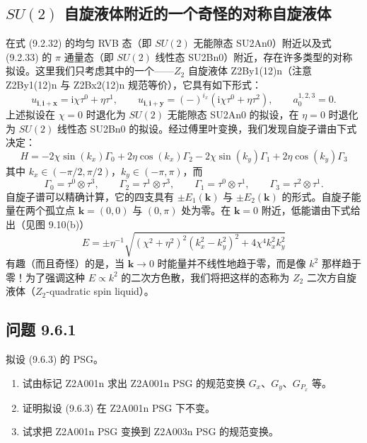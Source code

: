 \subsection{$SU(2)$ 自旋液体附近的一个奇怪的对称自旋液体}

在式 (9.2.32) 的均匀 RVB 态（即 $SU(2)$ 无能隙态 SU2An0）附近以及式 (9.2.33) 的 $\pi$ 通量态（即 $SU(2)$ 线性态 SU2Bn0）附近，存在许多类型的对称拟设。这里我们只考虑其中的一个——$Z_2$ 自旋液体 Z2By1(12)n（注意 Z2By1(12)n 与 Z2Bx2(12)n 规范等价），它具有如下形式：
\begin{equation*}
u_{\pmb{i},\pmb{i}+\pmb{x}}=\mathrm{i}\chi\tau^{0}+\eta\tau^{1},\qquad
u_{\pmb{i},\pmb{i}+\pmb{y}}=(-)^{i_x}(\mathrm{i}\chi\tau^{0}+\eta\tau^{2}),\qquad
a_0^{1,2,3}=0.
\tag{9.6.10}
\end{equation*}
上述拟设在 $\chi=0$ 时退化为 $SU(2)$ 无能隙态 SU2An0 的拟设，在 $\eta=0$ 时退化为 $SU(2)$ 线性态 SU2Bn0 的拟设。经过傅里叶变换，我们发现自旋子谱由下式决定：
\begin{equation*}
H=-2\chi\sin(k_x)\Gamma_0+2\eta\cos(k_x)\Gamma_2-2\chi\sin(k_y)\Gamma_1+2\eta\cos(k_y)\Gamma_3
\end{equation*}
其中 $k_x\in(-\pi/2,\pi/2)$，$k_y\in(-\pi,\pi)$，而
\begin{equation*}
\Gamma_0=\tau^{0}\otimes\tau^{3},\qquad
\Gamma_2=\tau^{1}\otimes\tau^{3},\qquad
\Gamma_1=\tau^{0}\otimes\tau^{1},\qquad
\Gamma_3=\tau^{2}\otimes\tau^{1}.
\end{equation*}
自旋子谱可以精确计算，它的四支具有 $\pm E_1(\pmb{k})$ 与 $\pm E_2(\pmb{k})$ 的形式。自旋子能量在两个孤立点 $\pmb{k}=(0,0)$ 与 $(0,\pi)$ 处为零。在 $\pmb{k}=0$ 附近，低能谱由下式给出（见图 9.10(b)）
\begin{equation*}
E=\pm\eta^{-1}\sqrt{(\chi^{2}+\eta^{2})^{2}(k_x^{2}-k_y^{2})^{2}+4\chi^{4}k_x^{2}k_y^{2}}
\end{equation*}
有趣（而且奇怪）的是，当 $\pmb{k}\to 0$ 时能量并不线性地趋于零，而是像 $k^{2}$ 那样趋于零！为了强调这种 $E\propto k^{2}$ 的二次方色散，我们将把这样的态称为 $Z_2$ 二次方自旋液体（$Z_2$-quadratic spin liquid）。

\subsection*{问题 9.6.1}

拟设 (9.6.3) 的 PSG。
\begin{enumerate}
\item 试由标记 Z2A001n 求出 Z2A001n PSG 的规范变换 $G_x$、$G_y$、$G_{P_x}$ 等。
\item 证明拟设 (9.6.3) 在 Z2A001n PSG 下不变。
\item 试求把 Z2A001n PSG 变换到 Z2A003n PSG 的规范变换。
\end{enumerate}

